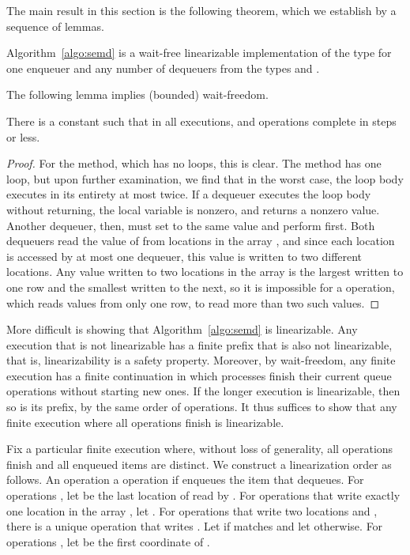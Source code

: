 The main result in this section is the following theorem, 
which we establish by a sequence of lemmas. 

\begin{theorem}
\label{theorem:correct}
Algorithm~\ref{algo:semd} 
is a wait-free linearizable implementation 
of the type  for one enqueuer and any number of dequeuers 
from the types  and . 
\end{theorem}

The following lemma implies (bounded) wait-freedom. 

\begin{lemma}
\label{lemma:waitfree}
There is a constant  such that in all executions, 
 and  operations complete in  steps or less. 
\end{lemma}
\begin{proof}
For the  method, which has no loops, this is clear. 
The  method has one loop, 
but upon further examination, 
we find that in the worst case, 
the loop body executes in its entirety at most twice.
If a dequeuer executes the loop body without returning, 
the local variable  is nonzero, 
and  returns a nonzero value. 
Another dequeuer, then, must set  to the same value 
and perform  first. 
Both dequeuers read the value of  
from locations in the array , 
and since each location is accessed by at most one dequeuer, 
this value is written to two different locations. 
Any value written to two locations in the array  
is the largest written to one row 
and the smallest written to the next, 
so it is impossible for a  operation, 
which reads values from only one row, 
to read more than two such values. 
\end{proof}

More difficult is showing that Algorithm~\ref{algo:semd} is linearizable. 
Any execution that is not linearizable 
has a finite prefix that is also not linearizable, 
that is, linearizability is a safety property. 
Moreover, by wait-freedom, 
any finite execution has a finite continuation 
in which processes finish their current queue operations 
without starting new ones. 
If the longer execution is linearizable, 
then so is its prefix, by the same order of operations. 
It thus suffices to show that any finite execution 
where all operations finish is linearizable. 

Fix a particular finite execution where, without loss of generality, 
all operations finish and all enqueued items are distinct. 
We construct a linearization order  as follows. 
An  operation   
a  operation  
if  enqueues the item that  dequeues. 
For  operations , 
let  be the last location  
of  read by . 
For  operations  
that write exactly one location  
in the array , let . 
For  operations  
that write two locations  and , 
there is a unique  operation  
that writes . 
Let  if  matches  
and let  otherwise. 
For operations , let  be the first coordinate of . 

